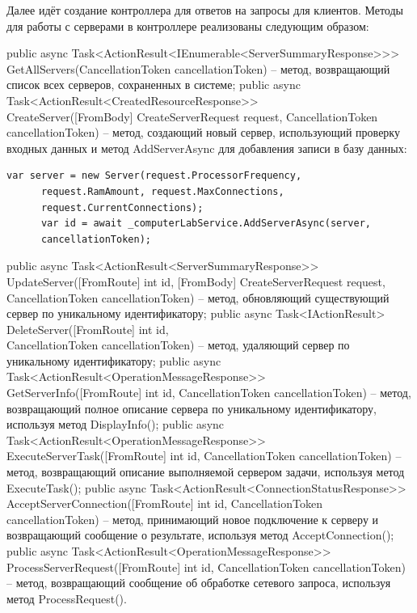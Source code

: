 \documentclass[oneside,14pt,a4paper]{extarticle}
\renewcommand{\item}{\itemindent1.25cm\itemold}
\begin{document}
  Далее идёт создание контроллера для ответов на запросы для клиентов. Методы для работы с серверами в контроллере реализованы следующим образом:
  \begin{itemize}
    \item[--] public async Task<ActionResult<IEnumerable<ServerSummaryResponse>>> GetAllServers(CancellationToken cancellationToken) -- метод, возвращающий список всех серверов, сохраненных в системе;
    \item[--] public async Task<ActionResult<CreatedResourceResponse>> \\
    CreateServer([FromBody] CreateServerRequest request, CancellationToken \\
    cancellationToken) -- метод, создающий новый сервер, использующий проверку входных данных и метод AddServerAsync для добавления записи в базу данных:
    \begin{Verbatim}[tabsize=4]
      var server = new Server(request.ProcessorFrequency, 
      request.RamAmount, request.MaxConnections, 
      request.CurrentConnections);
      var id = await _computerLabService.AddServerAsync(server, 
      cancellationToken);
    \end{Verbatim}
    \item[--] public async Task<ActionResult<ServerSummaryResponse>> \\
    UpdateServer([FromRoute] int id, [FromBody] CreateServerRequest request, \\
    CancellationToken cancellationToken) -- метод, обновляющий существующий сервер по уникальному идентификатору;
    \item[--] public async Task<IActionResult> DeleteServer([FromRoute] int id, \\
    CancellationToken cancellationToken) -- метод, удаляющий сервер по уникальному идентификатору;
    \item[--] public async Task<ActionResult<OperationMessageResponse>> \\
    GetServerInfo([FromRoute] int id, CancellationToken cancellationToken) -- метод, возвращающий полное описание сервера по уникальному идентификатору, используя метод DisplayInfo();
    \item[--] public async Task<ActionResult<OperationMessageResponse>> \\
    ExecuteServerTask([FromRoute] int id, CancellationToken cancellationToken) -- метод, возвращающий описание выполняемой сервером задачи, используя метод ExecuteTask();
    \item[--] public async Task<ActionResult<ConnectionStatusResponse>> \\
    AcceptServerConnection([FromRoute] int id, CancellationToken cancellationToken) -- метод, принимающий новое подключение к серверу и возвращающий сообщение о результате, используя метод AcceptConnection();
    \item[--] public async Task<ActionResult<OperationMessageResponse>> \\
    ProcessServerRequest([FromRoute] int id, CancellationToken cancellationToken) -- метод, возвращающий сообщение об обработке сетевого запроса, используя метод ProcessRequest().
  \end{itemize}
\end{document}
